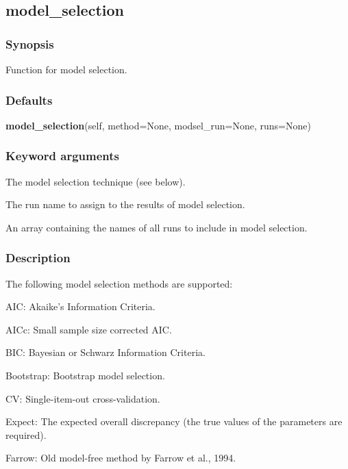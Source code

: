   

 \newpage 

 \subsection{model\_selection} 

  
 \subsubsection{Synopsis} 

 Function for model selection. 
  

  
 \subsubsection{Defaults} 

 \textsf{\textbf{model\_selection}(self, method=None, modsel\_run=None, runs=None)} 

  
 \subsubsection{Keyword arguments} 

   The model selection technique (see below).   

   The run name to assign to the results of model selection.   

   An array containing the names of all runs to include in model selection.  

  

  
 \subsubsection{Description} 

 The following model selection methods are supported: 
  

 AIC:  Akaike's Information Criteria. 
  

 AICc:  Small sample size corrected AIC. 
  

 BIC:  Bayesian or Schwarz Information Criteria. 
  

 Bootstrap:  Bootstrap model selection. 
  

 CV:  Single-item-out cross-validation. 
  

 Expect:  The expected overall discrepancy (the true values of the parameters are required). 
  

 Farrow:  Old model-free method by Farrow et al., 1994. 
  

